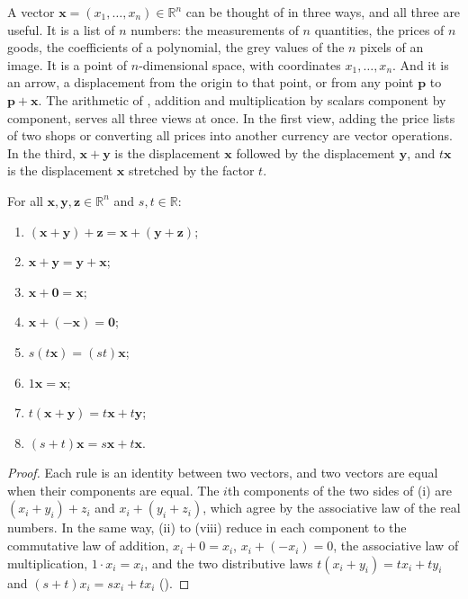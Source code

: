 A vector $\mathbf x=(x_1,\ldots,x_n)\in\mathbb R^n$ can be thought of in three ways, and all three are useful. It is a list of $n$ numbers: the measurements of $n$ quantities, the prices of $n$ goods, the coefficients of a polynomial, the grey values of the $n$ pixels of an image. It is a point of $n$-dimensional space, with coordinates $x_1,\ldots,x_n$. And it is an arrow, a displacement from the origin to that point, or from any point $\mathbf p$ to $\mathbf p+\mathbf x$. The arithmetic of , addition and multiplication by scalars component by component, serves all three views at once. In the first view, adding the price lists of two shops or converting all prices into another currency are vector operations. In the third, $\mathbf x+\mathbf y$ is the displacement $\mathbf x$ followed by the displacement $\mathbf y$, and $t\mathbf x$ is the displacement $\mathbf x$ stretched by the factor $t$.

\begin{proposition}
\label{prop:vector-rules}
For all $\mathbf x,\mathbf y,\mathbf z\in\mathbb R^n$ and $s,t\in\mathbb R$:
\begin{enumerate}
\item $(\mathbf x+\mathbf y)+\mathbf z=\mathbf x+(\mathbf y+\mathbf z)$;
\item $\mathbf x+\mathbf y=\mathbf y+\mathbf x$;
\item $\mathbf x+\mathbf 0=\mathbf x$;
\item $\mathbf x+(-\mathbf x)=\mathbf 0$;
\item $s(t\mathbf x)=(st)\mathbf x$;
\item $1\mathbf x=\mathbf x$;
\item $t(\mathbf x+\mathbf y)=t\mathbf x+t\mathbf y$;
\item $(s+t)\mathbf x=s\mathbf x+t\mathbf x$.
\end{enumerate}
\end{proposition}

\begin{proof}
Each rule is an identity between two vectors, and two vectors are equal when their components are equal. The $i$th components of the two sides of (i) are $(x_i+y_i)+z_i$ and $x_i+(y_i+z_i)$, which agree by the associative law of the real numbers. In the same way, (ii) to (viii) reduce in each component to the commutative law of addition, $x_i+0=x_i$, $x_i+(-x_i)=0$, the associative law of multiplication, $1\cdot x_i=x_i$, and the two distributive laws $t(x_i+y_i)=tx_i+ty_i$ and $(s+t)x_i=sx_i+tx_i$ ().
\end{proof}

